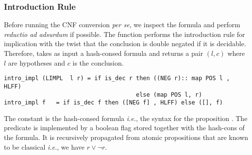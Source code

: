 \documentclass[utf8,a4paper,UKenglish,cleveref, autoref, thm-restate]{lipics-v2021}
\begin{document}
\subsubsection{Introduction Rule}
Before running the CNF conversion \emph{per se}, we inspect the
formula and perform \emph{reductio ad adsurdum} if possible. The
function  performs the introduction rule for
implication with the twist that the conclusion is double negated if it
is decidable. Therefore, 
takes as input a hash-consed formula and returns a pair
$(l,c)$ where $l$ are hypotheses and $c$ is the conclusion.
\begin{verbatim}
intro_impl (LIMPL  l r) = if is_dec r then ((NEG r):: map POS l , HLFF)
                                      else (map POS l, r)
intro_impl f   = if is_dec f then ([NEG f] , HLFF) else ([], f)
\end{verbatim}
The constant  is the hash-consed formula 
\emph{i.e.}, the syntax for the proposition .  The
 predicate is implemented by a boolean flag
stored together with the hash-cons of the formula. It is recursively
propagated from atomic propositions that are known to be classical
\emph{i.e.}, we have $r \lor \neg r$.
\end{document}
